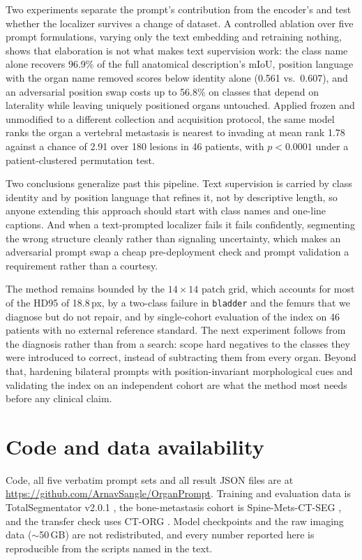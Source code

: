 \documentclass[10pt]{article}
\newcommand{\org}[1]{\texttt{#1}}
\begin{document}
Two experiments separate the prompt's contribution from the encoder's and test
whether the localizer survives a change of dataset. A controlled ablation over
five prompt formulations, varying only the text embedding and retraining nothing,
shows that elaboration is not what makes text supervision work: the class name
alone recovers 96.9\% of the full anatomical description's mIoU, position language
with the organ name removed scores below identity alone (0.561 vs.\ 0.607), and an
adversarial position swap costs up to 56.8\% on classes that depend on laterality
while leaving uniquely positioned organs untouched. Applied frozen and unmodified
to a different collection and acquisition protocol, the same model ranks the organ
a vertebral metastasis is nearest to invading at mean rank 1.78 against a chance
of 2.91 over 180 lesions in 46 patients, with $p<0.0001$ under a
patient-clustered permutation test.

Two conclusions generalize past this pipeline. Text supervision is carried by
class identity and by position language that refines it, not by descriptive
length, so anyone extending this approach should start with class names and
one-line captions. And when a text-prompted localizer fails it fails confidently,
segmenting the wrong structure cleanly rather than signaling uncertainty, which
makes an adversarial prompt swap a cheap pre-deployment check and prompt
validation a requirement rather than a courtesy.

The method remains bounded by the $14\times14$ patch grid, which accounts for most
of the HD95 of 18.8\,px, by a two-class failure in \org{bladder} and the femurs
that we diagnose but do not repair, and by single-cohort evaluation of the index
on 46 patients with no external reference standard. The next experiment follows
from the diagnosis rather than from a search: scope hard negatives to the classes
they were introduced to correct, instead of subtracting them from every organ.
Beyond that, hardening bilateral prompts with position-invariant morphological
cues and validating the index on an independent cohort are what the method most
needs before any clinical claim.

\section*{Code and data availability}
Code, all five verbatim prompt sets and all result JSON files are at
\url{https://github.com/ArnavSangle/OrganPrompt}. Training and evaluation data is
TotalSegmentator v2.0.1 \cite{wasserthal2023totalsegdataset}, the bone-metastasis
cohort is Spine-Mets-CT-SEG \cite{pieper2024spinemets}, and the transfer check
uses CT-ORG \cite{rister2020ctorg}. Model checkpoints and the raw imaging data
($\sim$50\,GB) are not redistributed, and every number reported here is
reproducible from the scripts named in the text.
\end{document}
